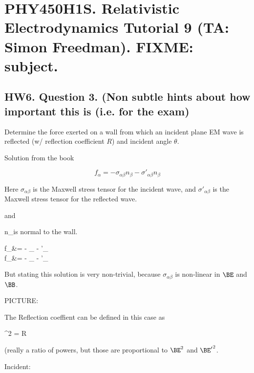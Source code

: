 
%

\chapter{PHY450H1S.  Relativistic Electrodynamics Tutorial 9 (TA: Simon Freedman).  FIXME: subject.}
\label{chap:relativisticElectrodynamicsT9}
{}
\date{Mar 30, 2011}

\beginArtWithToc

\section{HW6. Question 3. (Non subtle hints about how important this is (i.e. for the exam)}

Determine the force exerted on a wall from which an incident plane EM wave is reflected (w/ reflection coefficient $R$) and incident angle $\theta$.

Solution from the book

\begin{equation}\label{eqn:relativisticElectrodynamicsT9:n}
f_\alpha = - \sigma_{\alpha \beta} n_\beta - \sigma'_{\alpha \beta} n_\beta
\end{equation}

Here $\sigma_{\alpha \beta}$ is the Maxwell stress tensor for the incident wave, and $\sigma'_{\alpha \beta}$ is the Maxwell stress tensor for the reflected wave.

and 

n_\beta is normal to the wall.

f_\perp &= - \sigma_{\perp \perp} - \sigma'_{\perp \perp} \\
f_\parallel &= - \sigma_{\parallel \perp} - \sigma'_{\parallel \perp} 

But stating this solution is very non-trivial, because $\sigma_{\alpha \beta}$ is non-linear in $\BE$ and $\BB$.

PICTURE:

The Reflection coeffient can be defined in this case as

\Abs{\BE}^2 = R 

(really a ratio of powers, but those are proportional to $\BE^2$ and ${\BE'}^2$.

Incident:

